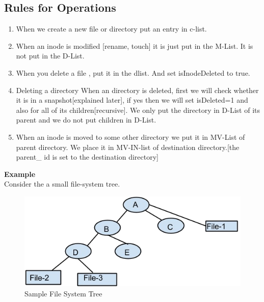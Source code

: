 \subsection{Rules for Operations}
\begin{enumerate}

\item  When we create a new file or directory put an entry in c-list.

\item When an inode is modified [rename, touch] it is just put in the M-List. It is not put in the D-List.

\item When you delete a file , put it in the dlist. And set isInodeDeleted to true.

\item Deleting a directory
When an directory is deleted, first we will check  whether it is in a snapshot[explained later], if yes then we will set isDeleted=1 and also for all of its children[recursive]. We only put the directory in D-List of its parent and we do not put children in D-List.

\item When an inode is moved to some other directory we put it in  MV-List of parent directory. We place it in MV-IN-list of destination  directory.[the parent\_ id is set to the destination directory]

\end{enumerate}

\textbf{Example}\\
Consider the a small file-system tree.\\
\begin{figure}[!h]
\centering  
 \includegraphics[scale=0.5]{figs/preliminar/FileSystemExample.png}
  \caption{Sample File System Tree}
  \label{fig:ExampleFileSystem}
\end{figure}


